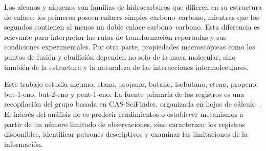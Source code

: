Los alcanos y alquenos son familias de hidrocarburos que difieren en su estructura de enlace: los primeros poseen enlaces simples carbono--carbono, mientras que los segundos contienen al menos un doble enlace carbono--carbono. Esta diferencia es relevante para interpretar las rutas de transformación reportadas y sus condiciones experimentales. Por otra parte, propiedades macroscópicas como los puntos de fusión y ebullición dependen no solo de la masa molecular, sino también de la estructura y la naturaleza de las interacciones intermoleculares.

Este trabajo estudia metano, etano, propano, butano, isobutano, eteno, propeno, but-1-eno, but-2-eno y pent-1-eno. La fuente primaria de los registros es una recopilación del grupo basada en CAS-SciFinder, organizada en hojas de cálculo~\cite{datoscrudos,datoslimpios,cas}. El interés del análisis no es predecir rendimientos o establecer mecanismos a partir de un número limitado de observaciones, sino caracterizar los registros disponibles, identificar patrones descriptivos y examinar las limitaciones de la información.
